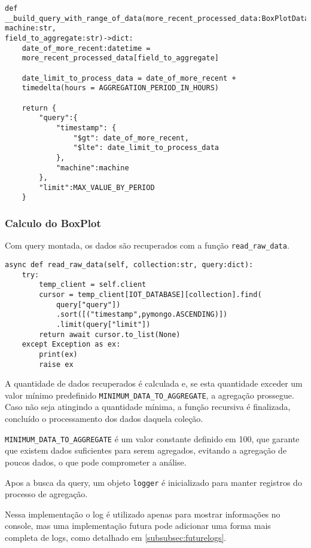 \begin{verbatim}
def __build_query_with_range_of_data(more_recent_processed_data:BoxPlotData,
machine:str,
field_to_aggregate:str)->dict:
    date_of_more_recent:datetime = 
    more_recent_processed_data[field_to_aggregate]

    date_limit_to_process_data = date_of_more_recent + 
    timedelta(hours = AGGREGATION_PERIOD_IN_HOURS)

    return {
        "query":{
            "timestamp": {
                "$gt": date_of_more_recent,
                "$lte": date_limit_to_process_data
            },
            "machine":machine
        },
        "limit":MAX_VALUE_BY_PERIOD
    }

\end{verbatim}

\subsubsection{Calculo do BoxPlot}
Com query montada, os dados são recuperados com a função \texttt{read\_raw\_data}.

\begin{verbatim}
async def read_raw_data(self, collection:str, query:dict):
    try:
        temp_client = self.client
        cursor = temp_client[IOT_DATABASE][collection].find(
            query["query"])
            .sort([("timestamp",pymongo.ASCENDING)])
            .limit(query["limit"])
        return await cursor.to_list(None)
    except Exception as ex:
        print(ex)
        raise ex
\end{verbatim}

A quantidade de dados recuperados é calculada e, se esta quantidade exceder um valor mínimo predefinido \texttt{MINIMUM\_DATA\_TO\_AGGREGATE}, a agregação prossegue. Caso não seja atingindo a quantidade mínima, a função recursiva é finalizada, concluído o processamento dos dados daquela coleção.

\texttt{MINIMUM\_DATA\_TO\_AGGREGATE} é um valor constante definido em 100, que garante que existem dados suficientes para serem agregados, evitando a agregação de poucos dados, o que pode comprometer a análise. 

Apos a busca da query, um objeto \texttt{logger} é inicializado para manter registros do processo de agregação.

Nessa implementação o log é utilizado apenas para mostrar informações no console, mas uma implementação futura pode adicionar uma forma mais completa de logs, como detalhado em \ref{subsubsec:futurelogs}.

